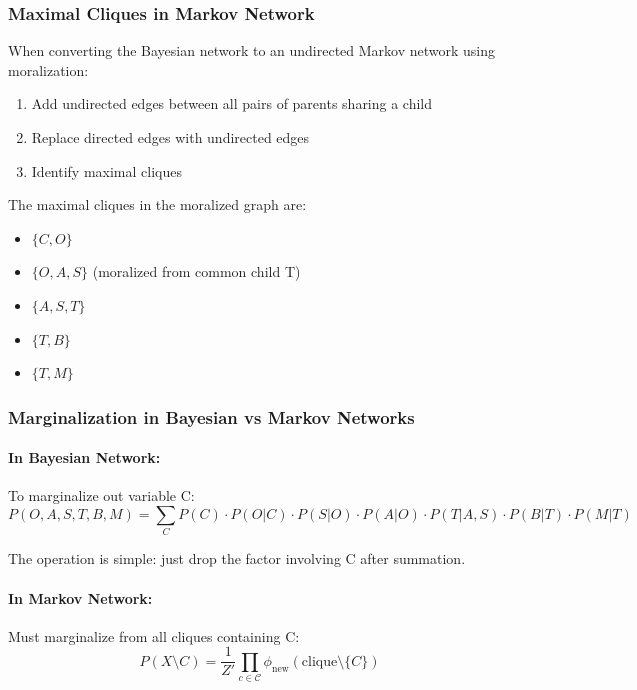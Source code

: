 \documentclass[conference]{IEEEtran}
\begin{document}
\subsubsection{Maximal Cliques in Markov Network}

When converting the Bayesian network to an undirected Markov network using moralization:
\begin{enumerate}
    \item Add undirected edges between all pairs of parents sharing a child
    \item Replace directed edges with undirected edges
    \item Identify maximal cliques
\end{enumerate}

The maximal cliques in the moralized graph are:
\begin{itemize}
    \item $\{C, O\}$
    \item $\{O, A, S\}$ (moralized from common child T)
    \item $\{A, S, T\}$
    \item $\{T, B\}$
    \item $\{T, M\}$
\end{itemize}

\subsubsection{Marginalization in Bayesian vs Markov Networks}

\paragraph{In Bayesian Network:}
To marginalize out variable C:
\begin{equation}
P(O,A,S,T,B,M) = \sum_C P(C) \cdot P(O|C) \cdot P(S|O) \cdot P(A|O) \cdot P(T|A,S) \cdot P(B|T) \cdot P(M|T)
\end{equation}

The operation is simple: just drop the factor involving C after summation.

\paragraph{In Markov Network:}
Must marginalize from all cliques containing C:
\begin{equation}
P(X \setminus C) = \frac{1}{Z'} \prod_{c \in \mathcal{C}} \phi_{\text{new}}(\text{clique} \setminus \{C\})
\end{equation}
\end{document}
